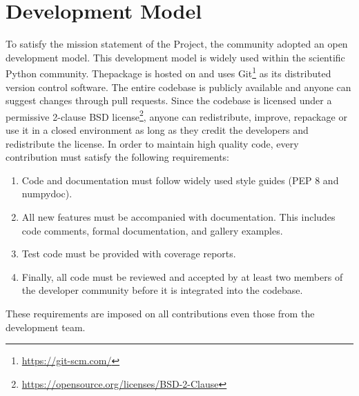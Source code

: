 \section{Development Model}

To satisfy the mission statement of the Project, the \sunpy community adopted an open development model.
This development model is widely used within the scientific Python community.
The\sunpypkg package is hosted on \github and uses Git\footnote{\url{https://git-scm.com/}} as its distributed version control software.
The entire codebase is publicly available and anyone can suggest changes through pull requests.
Since the codebase is licensed under a permissive 2-clause BSD license\footnote{\url{https://opensource.org/licenses/BSD-2-Clause}}, anyone can redistribute, improve, repackage or use it in a closed environment as long as they credit the \sunpy developers and redistribute the license.
In order to maintain high quality code, every contribution must satisfy the following requirements:
\begin{enumerate}
    \item Code and documentation must follow widely used style guides (PEP 8 and numpydoc).
    \item All new features must be accompanied with documentation.
    This includes code comments, formal documentation, and gallery examples.
    \item Test code must be provided with coverage reports.
    \item Finally, all code must be reviewed and accepted by at least two members of the developer community before it is integrated into the codebase.
\end{enumerate}
These requirements are imposed on all contributions even those from the \sunpy development team.

